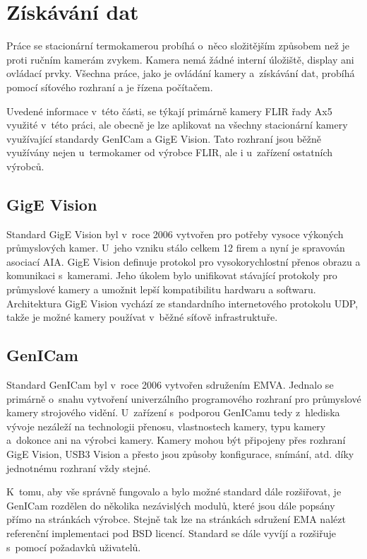 \section{Získávání dat} \label{section:retrieving_camera_data}
Práce se stacionární termokamerou probíhá o~něco složitějším způsobem než je proti ručním kamerám zvykem. Kamera nemá žádné interní úložiště, display ani ovládací prvky. Všechna práce, jako je ovládání kamery a~získávání dat, probíhá pomocí síťového rozhraní a je řízena počítačem. \cite{kuvzel2010bezkontaktni}

Uvedené informace v~této části, se týkají primárně kamery FLIR řady Ax5 využité v~této práci, ale obecně je lze aplikovat na všechny stacionární kamery využívající standardy GenICam a GigE Vision. Tato rozhraní jsou běžně využívány nejen u~termokamer od výrobce FLIR, ale i u~zařízení ostatních výrobců.
    
    \subsection{GigE Vision}\label{section:gige_vision}
    Standard GigE Vision byl v~roce 2006 vytvořen pro potřeby vysoce výkoných průmyslových kamer. U~jeho vzniku stálo celkem 12 firem a nyní je spravován asociací AIA. GigE Vision definuje protokol pro vysokorychlostní přenos obrazu a komunikaci s~kamerami. Jeho úkolem bylo unifikovat stávající protokoly pro průmyslové kamery a umožnit lepší kompatibilitu hardwaru a softwaru. Architektura GigE Vision vychází ze standardního internetového protokolu UDP, takže je možné kamery používat v~běžné síťově infrastruktuře. \cite{aiaGigeVision} 

    \subsection{GenICam}\label{section:genicam}
    Standard GenICam byl v~roce 2006 vytvořen sdružením EMVA. Jednalo se primárně o~snahu vytvoření univerzálního programového rozhraní pro průmyslové kamery strojového vidění. U~zařízení s~podporou GenICamu tedy z~hlediska vývoje nezáleží na technologii přenosu, vlastnostech kamery, typu kamery a~dokonce ani na výrobci kamery. Kamery mohou být připojeny přes rozhraní GigE Vision, USB3 Vision a přesto jsou způsoby konfigurace, snímání, atd. díky jednotnému rozhraní vždy stejné. \cite{emvaGenicam} 
    
    K~tomu, aby vše správně fungovalo a bylo možné standard dále rozšiřovat, je GenICam rozdělen do několika nezávislých modulů, které jsou dále popsány přímo na stránkách výrobce. Stejně tak lze na stránkách sdružení EMA nalézt referenční implementaci pod BSD licencí. Standard se dále vyvíjí a rozšiřuje s~pomocí požadavků uživatelů.

